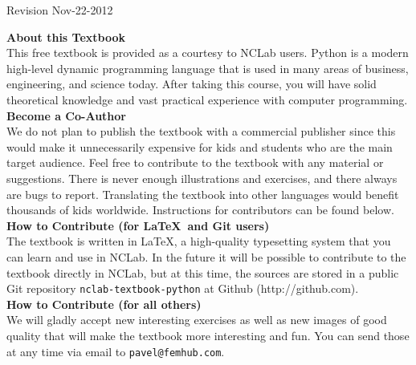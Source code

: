 \documentclass[article,A4,12pt]{llncs}
\begin{document}

\pagestyle{empty}
\newpage
\vbox{}
\newpage
\vbox{}
\vfill

\centerline{Revision Nov-22-2012}

\newpage

\noindent
{\bf About this Textbook}\\[4mm]
This free textbook is provided as a courtesy to NCLab users. 
Python is a modern high-level 
dynamic programming language that is used in many areas of business, 
engineering, and science today. After taking this course, you will 
have solid theoretical knowledge and vast practical experience with 
computer programming. \\[4mm]

\noindent
{\bf Become a Co-Author}\\[4mm]
We do not plan to publish the textbook with a commercial publisher since this 
would make it unnecessarily expensive for kids and students who are the main 
target audience. Feel free to contribute to the textbook with any material or 
suggestions. There is never enough illustrations and exercises, and there always 
are bugs to report. Translating the textbook into other languages would benefit
thousands of kids worldwide. Instructions for contributors can be found 
below.\\[4mm]

\noindent
{\bf How to Contribute (for \LaTeX \ and Git users)}\\[4mm]
\noindent
The textbook is written in \LaTeX, a high-quality typesetting system that 
you can learn and use in NCLab. In the future it will be possible to contribute to 
the textbook directly in NCLab, but at this time, the sources are stored 
in a public Git repository {\tt nclab-textbook-python} at Github (http://github.com). \\[4mm]

\noindent
{\bf How to Contribute (for all others)}\\[4mm]
\noindent
We will gladly accept new interesting exercises as well as
new images of good quality that will make the textbook more interesting and fun. You
can send those at any time via email to {\tt pavel@femhub.com}.\\[4mm]
\end{document}
